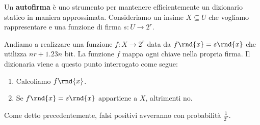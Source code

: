\documentclass[\main/main.tex]{subfiles}
\begin{document}
\begin{definition}[Autofirma]
    Un \textbf{autofirma} è uno strumento per mantenere efficientemente un dizionario statico in maniera approssimata. Consideriamo un insime \(X \subseteq U\) che vogliamo rappresentare e una funzione di firma \(s: U \rightarrow 2^r\).
    
    Andiamo a realizzare una funzione \(f: X \rightarrow 2^r\) data da \(f\rnd{x} = s\rnd{x}\) che utilizza \(nr+1.23n\) bit. La funzione \(f\) mappa ogni chiave nella propria firma. Il dizionaria viene a questo punto interrogato come segue:
    \begin{enumerate}
        \item Calcoliamo \(f\rnd{x}\).
        \item Se \(f\rnd{x} = s\rnd{x}\) appartiene a \(X\), altrimenti no.
    \end{enumerate}
    Come detto precedentemente, falsi positivi avveranno con probabilità \(\frac{1}{2^r}\).
\end{definition}
\end{document}
